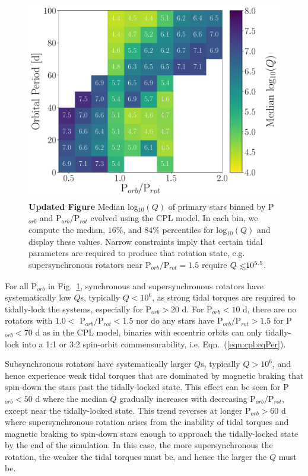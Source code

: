 \documentclass[twocolumn]{aastex61}
\def\lsim{~\rlap{$<$}{\lower 1.0ex\hbox{$\sim$}}}
\newcommand{\xxx}[1]{{\textbf{#1}}}
\begin{document}
\begin{figure}
	\includegraphics[width=\textwidth]{../Plots/porbProtPorbQHist.pdf}
   \caption{\xxx{Updated Figure} Median log$_{10}(Q)$ of primary stars binned by P$_{orb}$ and P$_{orb}/$P$_{rot}$ evolved using the CPL model.  In each bin, we compute the median, $16\%$, and $84\%$ percentiles for log$_{10}(Q)$ and display these values. Narrow constraints imply that certain tidal parameters are required to produce that rotation state, e.g. supersynchronous rotators near P$_{orb}/$P$_{rot} = 1.5$ require $Q \lsim 10^{5.5}$. }%
    \label{fig:qmap}%
\end{figure}

For all P$_{orb}$ in Fig.~\ref{fig:qmap}, synchronous and supersynchronous rotators have systematically low $Q$s, typically $Q < 10^6$, as strong tidal torques are required to tidally-lock the systems, especially for P$_{orb} > 20$ d. For P$_{orb} < 10$ d, there are no rotators with $1.0 <$ P$_{orb}/$P$_{rot} < 1.5$ nor do any stars have P$_{orb}/$P$_{rot} > 1.5$ for P$_{orb} < 70$ d as in the CPL model, binaries with eccentric orbits can only tidally-lock into a 1:1 or 3:2 spin-orbit commensurability, i.e. Eqn.~(\ref{eqn:cpl:eqPer}).   

Subsynchronous rotators have systematically larger $Q$s, typically $Q > 10^6$, and hence experience weak tidal torques that are dominated by magnetic braking that spin-down the stars past the tidally-locked state.  This effect can be seen for P$_{orb} < 50$ d where the median $Q$ gradually increases with decreasing P$_{orb}/$P$_{rot}$, except near the tidally-locked state.  This trend reverses at longer P$_{orb} > 60$ d where supersynchronous rotation arises from the inability of tidal torques and magnetic braking to spin-down stars enough to approach the tidally-locked state by the end of the simulation.  In this case, the more supersynchronous the rotation, the weaker the tidal torques must be, and hence the larger the $Q$ must be. 
\end{document}
